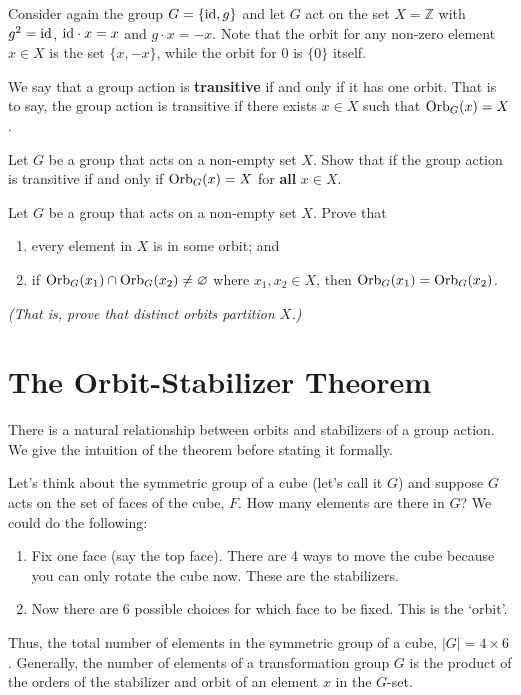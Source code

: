\begin{example}
    Consider again the group $G = \{\mathrm{id}, g\}$ and let $G$ act on the set $X = \mathbb{Z}$ with $g^2 = \mathrm{id}$, $\mathrm{id} \cdot x = x$ and $g \cdot x = -x$. Note that the orbit for any non-zero element $x \in X$ is the set $\{x, -x\}$, while the orbit for 0 is $\{0\}$ itself.
\end{example}

We say that a group action is \textbf{transitive} if and only if it has one orbit. That is to say, the group action is transitive if there exists $x \in X$ such that $\mathrm{Orb}_{G}(x) = X$.

\begin{exercise}
    Let $G$ be a group that acts on a non-empty set $X$. Show that if the group action is transitive if and only if $\mathrm{Orb}_{G}(x) = X$ for \textbf{all} $x \in X$.
\end{exercise}

\begin{exercise}\label{exercise-distinct-orbits-partition-set}
    Let $G$ be a group that acts on a non-empty set $X$. Prove that
    \begin{enumerate}[label=(\alph*)]
        \item every element in $X$ is in some orbit; and
        \item if $\mathrm{Orb}_{G}(x_1) \cap \mathrm{Orb}_{G}(x_2) \neq \varnothing$ where $x_1, x_2 \in X$, then $\mathrm{Orb}_{G}(x_1) = \mathrm{Orb}_{G}(x_2)$.
    \end{enumerate}
    \textit{(That is, prove that distinct orbits partition $X$.)}
\end{exercise}



\section{The Orbit-Stabilizer Theorem}
There is a natural relationship between orbits and stabilizers of a group action. We give the intuition of the theorem before stating it formally.

Let's think about the symmetric group of a cube (let's call it $G$) and suppose $G$ acts on the set of faces of the cube, $F$. How many elements are there in $G$? We could do the following:
\begin{enumerate}
    \item Fix one face (say the top face). There are 4 ways to move the cube because you can only rotate the cube now. These are the stabilizers.
    \item Now there are 6 possible choices for which face to be fixed. This is the `orbit'.
\end{enumerate}
Thus, the total number of elements in the symmetric group of a cube, $|G| = 4 \times 6$. Generally, the number of elements of a transformation group $G$ is the product of the orders of the stabilizer and orbit of an element $x$ in the $G$-set.

